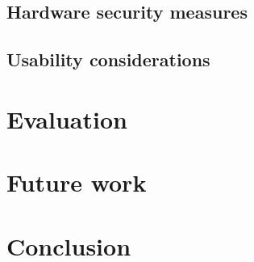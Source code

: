 \documentclass[12pt,a4paper,notitlepage]{article}
\begin{document}
\subsection{Hardware security measures}

\subsection{Usability considerations}

\section{Evaluation}

\section{Future work}

\section{Conclusion}


%
\end{document}
